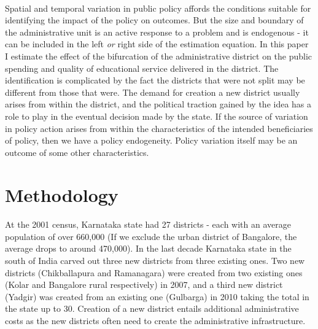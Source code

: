 \documentclass[12pt, a4paper]{article}
\begin{document}
\paragraph{} Spatial and temporal variation in public policy affords the conditions suitable for identifying the impact of the policy on outcomes. But the size and boundary of the administrative unit is an active response to a problem and is endogenous - it can be included in the left \textit{or} right side of the estimation equation. In this paper I estimate the effect of the bifurcation of the administrative district on the public spending and quality of educational service delivered in the district. The identification is complicated by the fact the districts that were not split may be different from those that were. The demand for creation a new district usually arises from within the district, and the political traction gained by the idea has a role to play in the eventual decision made by the state. If the source of variation in policy action arises from within the characteristics of the intended beneficiaries of policy, then we have a policy endogeneity. Policy variation itself may be an outcome of some other characteristics. 
\section*{Methodology}
\paragraph{} At the 2001 census, Karnataka state had 27 districts - each with an average population of over 660,000 (If we exclude the urban district of Bangalore, the average drops to around 470,000). In the last decade Karnataka state in the south of India carved out three new districts from three existing ones. Two new districts (Chikballapura and Ramanagara) were created from two existing ones (Kolar and Bangalore rural respectively) in 2007, and a third new district (Yadgir) was created from an existing one (Gulbarga) in 2010 taking the total in the state up to 30. Creation of a new district entails additional administrative costs as the new districts often need to create the administrative infrastructure.


\printbibliography
\end{document}
